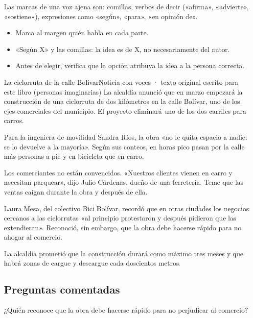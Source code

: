 Las marcas de una voz ajena son: comillas, verbos de decir («afirma», «advierte», «sostiene»), expresiones como «según»,
«para», «en opinión de».


\begin{regla}
\begin{itemize}
  \item Marca al margen quién habla en cada parte.
  \item «Según X» y las comillas: la idea es de X, no necesariamente del autor.
  \item Antes de elegir, verifica que la opción atribuya la idea a la persona correcta.
\end{itemize}
\end{regla}

\begin{texto}{La ciclorruta de la calle Bolívar}{Noticia con voces · texto original escrito para este libro (personas imaginarias)}
\pa La alcaldía anunció que en marzo empezará la construcción de una ciclorruta de dos kilómetros en la calle Bolívar, uno
de los ejes comerciales del municipio. El proyecto eliminará uno de los dos carriles para carros.

\pa Para la ingeniera de movilidad Sandra Ríos, la obra «no le quita espacio a nadie: se lo devuelve a la mayoría». Según
sus conteos, en horas pico pasan por la calle más personas a pie y en bicicleta que en carro.

\pa Los comerciantes no están convencidos. «Nuestros clientes vienen en carro y necesitan parquear», dijo Julio Cárdenas,
dueño de una ferretería. Teme que las ventas caigan durante la obra y después de ella.

\pa Laura Mesa, del colectivo Bici Bolívar, recordó que en otras ciudades los negocios cercanos a las ciclorrutas «al
principio protestaron y después pidieron que las extendieran». Reconoció, sin embargo, que la obra debe hacerse rápido
para no ahogar al comercio.

\pa La alcaldía prometió que la construcción durará como máximo tres meses y que habrá zonas de cargue y descargue cada
doscientos metros.
\end{texto}

\subsection{Preguntas comentadas}
\begin{comentada}{¿Quién reconoce que la obra debe hacerse rápido para no perjudicar al comercio?}
\end{comentada}

